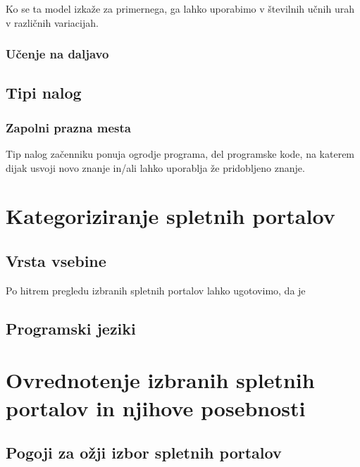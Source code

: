 Ko se ta model izkaže za primernega, ga lahko uporabimo v številnih
učnih urah v različnih variacijah.

\subsubsection{Učenje  na daljavo}
\label{sec:Učenje_na_daljavo}


\subsection{Tipi nalog}
\label{tipi_nalog}

\subsubsection{Zapolni prazna mesta}
\label{sec:zapolni_prazna_mesta}

Tip nalog začenniku ponuja ogrodje programa, del programske kode, na
katerem dijak usvoji novo znanje in/ali lahko uporablja že pridobljeno
znanje.


\section{Kategoriziranje spletnih portalov}
\label{sec:kategoriziranje_spletnih_portalov}

\subsection{Vrsta vsebine}
\label{sec:Razvrstitev_spletnih_portalov}

Po hitrem pregledu izbranih spletnih portalov lahko ugotovimo, da je

\subsection{Programski jeziki}
\label{sec:programski_jeziki}


\section{Ovrednotenje izbranih spletnih portalov in njihove posebnosti}
\label{sec:pregled_spletnih_portalov}

\subsection{Pogoji za ožji izbor spletnih portalov}
\label{sec:pogoji_za_ožji_izbor_sp}



